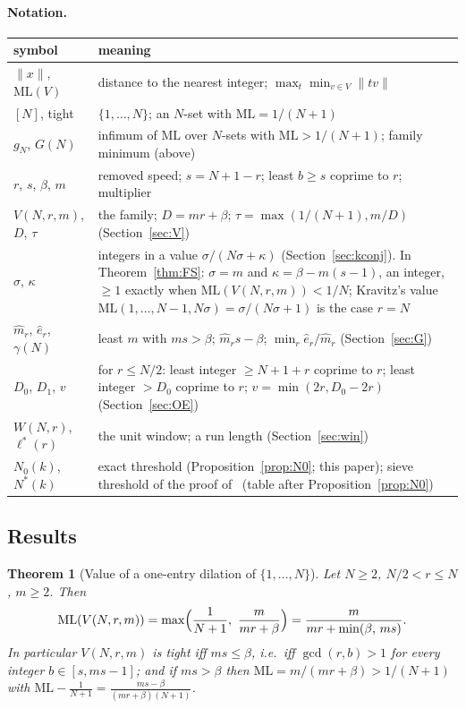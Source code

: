 \documentclass[11pt]{article}
\newtheorem{theorem}{Theorem}[section]
\theoremstyle{definition}
\theoremstyle{remark}
\newcommand{\nd}[1]{\lVert #1\rVert}
\newcommand{\ML}{\mathrm{ML}}
\begin{document}
\paragraph{Notation.}
\begin{center}
\small
\begin{tabular}{l p{}}
\toprule
symbol & meaning \\
\midrule
$\nd{x}$, $\ML(V)$ & distance to the nearest integer; $\max_t\min_{v\in V}\nd{tv}$ \\
$[N]$, tight & $\{1,\dots,N\}$; an $N$-set with $\ML=1/(N+1)$ \\
$g_N$, $G(N)$ & infimum of $\ML$ over $N$-sets with $\ML>1/(N+1)$; family minimum (above) \\
$r$, $s$, $\beta$, $m$ & removed speed; $s=N+1-r$; least $b\ge s$ coprime to $r$; multiplier \\
$V(N,r,m)$, $D$, $\tau$ & the family; $D=mr+\beta$; $\tau=\max(1/(N+1),m/D)$ (Section~\ref{sec:V}) \\
$\sigma$, $\kappa$ & integers in a value $\sigma/(N\sigma+\kappa)$ (Section~\ref{sec:kconj}). In Theorem~\ref{thm:FS}: $\sigma=m$ and $\kappa=\beta-m(s-1)$, an integer, $\ge1$ exactly when $\ML(V(N,r,m))<1/N$; Kravitz's value $\ML(1,\dots,N-1,N\sigma)=\sigma/(N\sigma+1)$ is the case $r=N$ \\
$\hat m_r$, $\hat e_r$, $\gamma(N)$ & least $m$ with $ms>\beta$; $\hat m_rs-\beta$; $\min_r\hat e_r/\hat m_r$ (Section~\ref{sec:G}) \\
$D_0$, $D_1$, $v$ & for $r\le N/2$: least integer $\ge N+1+r$ coprime to $r$; least integer $>D_0$ coprime to $r$; $v=\min(2r,D_0-2r)$ (Section~\ref{sec:OE}) \\
$W(N,r)$, $\ell^*(r)$ & the unit window; a run length (Section~\ref{sec:win}) \\
$N_0(k)$, $N^*(k)$ & exact threshold (Proposition~\ref{prop:N0}; this paper); sieve threshold of the proof of~\cite{B} (table after Proposition~\ref{prop:N0}) \\
\bottomrule
\end{tabular}
\end{center}

\subsection{Results}
\begin{theorem}[Value of a one-entry dilation of $\{1,\dots,N\}$]\label{thm:V}
Let $N\ge2$, $N/2<r\le N$, $m\ge2$. Then
\[
\ML(V(N,r,m))=\max\Bigl(\frac1{N+1},\ \frac{m}{mr+\beta}\Bigr)=\frac{m}{mr+\min(\beta,\,ms)}.
\]
In particular $V(N,r,m)$ is tight iff $ms\le\beta$, i.e.\ iff $\gcd(r,b)>1$ for every integer $b\in[s,ms-1]$; and if $ms>\beta$ then $\ML=m/(mr+\beta)>1/(N+1)$ with $\ML-\frac1{N+1}=\frac{ms-\beta}{(mr+\beta)(N+1)}$.
\end{theorem}
\end{document}
